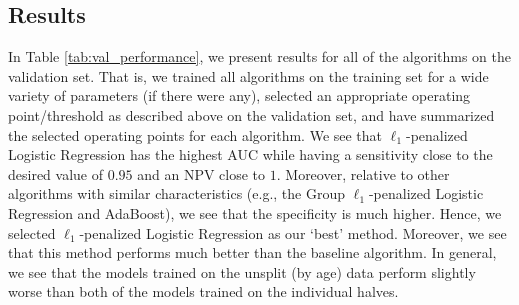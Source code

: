 \documentclass[11pt, letterpaper]{amsart}
\let\Oldsubsection\subsection
\renewcommand{\subsection}{\FloatBarrier\Oldsubsection}
\begin{document}
\subsection{Results} \label{ssec:results}

In Table \ref{tab:val_performance}, we present results for all of the algorithms on the validation set. That is, we trained all algorithms on the training set for a wide variety of parameters (if there were any), selected an appropriate operating point/threshold as described above on the validation set, and have summarized the selected operating points for each algorithm. We see that $\ell_1$-penalized Logistic Regression has the highest AUC while having a sensitivity close to the desired value of $0.95$ and an NPV close to $1$. Moreover, relative to other algorithms with similar characteristics (e.g., the Group $\ell_1$-penalized Logistic Regression and AdaBoost), we see that the specificity is much higher. Hence, we selected $\ell_1$-penalized Logistic Regression as our `best' method. Moreover, we see that this method performs much better than the baseline algorithm. In general, we see that the models trained on the unsplit (by age) data perform slightly worse than both of the models trained on the individual halves. 
\end{document}
